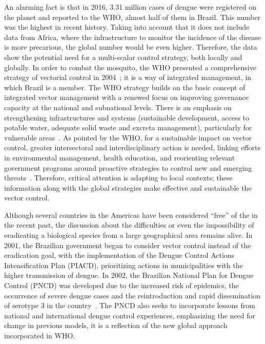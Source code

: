 An alarming fact is that in 2016, 3.31 million cases of dengue were registered on the planet and reported to the WHO, almost half of them in Brazil.
This number was the highest in recent history.
Taking into account that it does not include data from Africa, where the infrastructure to monitor the incidence of the disease is more precarious, the global number would be even higher.
Therefore, the data show the potential need for a multi-scalar \Aedes control strategy, both locally and globally.
In order to combat the mosquito, the WHO presented a comprehensive strategy of vectorial control in 2004~\cite{world2004global}; it is a way of integrated management, in which Brazil is a member.
%
The WHO strategy builds on the basic concept of integrated vector management with a renewed focus on improving governance capacity at the national and subnational levels.
There is an emphasis on strengthening infrastructures and systems (\eg sustainable development, access to potable water, adequate solid waste and excreta management), particularly for vulnerable areas~\cite{world2012global}.
As pointed by the WHO, for a sustainable impact on vector control, greater intersectoral and interdisciplinary action is needed, linking efforts in environmental management, health education, and reorienting relevant government programs around proactive strategies to control new and emerging threats~\cite{world2012global}.
Therefore, critical attention is adapting to local contexts; these information along with the global strategies make effective and sustainable the vector control.

Although several countries in the Americas have been considered “free” of the \Aedes in the recent past, the discussion about the difficulties or even the impossibility of eradicating a biological species from a large geographical area remains alive.
In 2001, the Brazilian government began to consider vector control instead of the eradication goal, with the implementation of the Dengue Control Actions Intensification Plan (PIACD), prioritizing actions in municipalities with the higher transmission of dengue. In 2002, the Brazilian National Plan for Dengue Control (PNCD) was developed due to the increased risk of epidemics, the occurrence of severe dengue cases and the reintroduction and rapid dissemination of serotype 3 in the country~\cite{web:pncdbrasil}.
The PNCD also seeks to incorporate lessons from national and international dengue control experiences, emphasizing the need for change in previous models, \ie it is a reflection of the new global approach incorporated in WHO.

